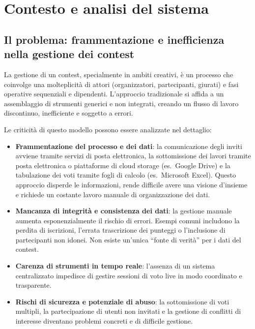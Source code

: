 
\chapter{Contesto e analisi del sistema}\label{ch:contesto-e-analisi-del-sistema}

\section{Il problema: frammentazione e inefficienza nella gestione dei contest}\label{sec:problema-frammentazione-inefficienza}
La gestione di un contest, specialmente in ambiti creativi, è un processo che coinvolge una molteplicità di attori (organizzatori, partecipanti, giurati) e fasi operative sequenziali e dipendenti.
L'approccio tradizionale si affida a un assemblaggio di strumenti generici e non integrati, creando un flusso di lavoro discontinuo, inefficiente e soggetto a errori.

Le criticità di questo modello possono essere analizzate nel dettaglio:
\begin{itemize}
    \item \textbf{Frammentazione del processo e dei dati}: la comunicazione degli inviti avviene tramite servizi di posta elettronica, la sottomissione dei lavori tramite posta elettronica o piattaforme di cloud storage (es.\ Google Drive) e la tabulazione dei voti tramite fogli di calcolo (es.\ Microsoft Excel).
    Questo approccio disperde le informazioni, rende difficile avere una visione d'insieme e richiede un costante lavoro manuale di organizzazione dei dati.
    \item \textbf{Mancanza di integrità e consistenza dei dati}: la gestione manuale aumenta esponenzialmente il rischio di errori.
    Esempi comuni includono la perdita di iscrizioni, l'errata trascrizione dei punteggi o l'inclusione di partecipanti non idonei.
    Non esiste un'unica ``fonte di verità'' per i dati del contest.
    \item \textbf{Carenza di strumenti in tempo reale}: l'assenza di un sistema centralizzato impedisce di gestire sessioni di voto live in modo coordinato e trasparente.
    \item \textbf{Rischi di sicurezza e potenziale di abuso}: la sottomissione di voti multipli, la partecipazione di utenti non invitati e la gestione di conflitti di interesse diventano problemi concreti e di difficile gestione.
\end{itemize}

